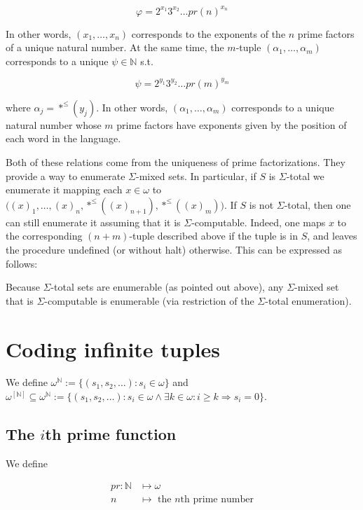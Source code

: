\documentclass[a4paper, 12pt]{article}
\begin{document}
$$
\varphi = 2^{x_1}3^{x_2} \ldots pr(n)^{x_n}
$$

In other words, $(x_1, \ldots, x_n)$ corresponds to the exponents of the $n$
prime factors of a unique natural number. At the same time, the $m$-tuple
$(\alpha_1, \ldots, \alpha_m)$ corresponds to a unique $\psi \in \mathbb{N}$
s.t. 

$$
\psi = 2^{y_1}3^{y_2}\ldots pr(m)^{y_m}
$$

where $\alpha_j = *^{\leq}(y_j)$. In other words, $(\alpha_1, \ldots, \alpha_m)$
corresponds to a unique natural number whose $m$ prime factors have exponents
given by the position of each word in the language.

Both of these relations come from the uniqueness of prime factorizations.
They provide a way to enumerate $\Sigma$-mixed sets. In
particular, if $S$ is $\Sigma$-total we enumerate it mapping each $x \in \omega$
to $\big((x)_1, \ldots, (x)_n, *^{\leq}((x)_{n+1}), *^{\leq}((x)_m)\big)$. If
$S$ is not $\Sigma$-total, then one can still enumerate it assuming that it is
$\Sigma$-computable. Indeed, one maps $x$ to the corresponding $(n+m)$-tuple
described above if the tuple is in $S$, and leaves the procedure undefined (or
without halt) otherwise. This can be expressed as follows:

Because $\Sigma$-total sets are enumerable (as pointed out above), any
$\Sigma$-mixed set that is $\Sigma$-computable is enumerable (via restriction
of the $\Sigma$-total enumeration).

\section{Coding infinite tuples}

We define $\omega^{\mathbb{N}} := \{ (s_1, s_2, \ldots) : s_i \in \omega \}$ and
$\omega^{\left[ \mathbb{N} \right] } \subseteq \omega^{\mathbb{N}} := \{(s_1,
s_2, \ldots) : s_i \in \omega \land \exists k \in \omega : i \geq k
\Rightarrow s_i = 0\}$. 

\subsection{The $i$th prime function}

We define 

\begin{align*}
    pr : \mathbb{N} &\mapsto \omega  \\ 
    n &\mapsto \text{ the $n$th prime number}
\end{align*}
\end{document}
